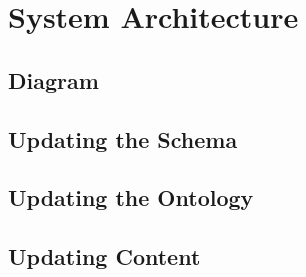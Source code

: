 \documentclass{beamer}
\begin{document}
\section{System Architecture}

\subsection{Diagram}


\subsection{Updating the Schema}


\subsection{Updating the Ontology}

\subsection{Updating Content}
\end{document}
